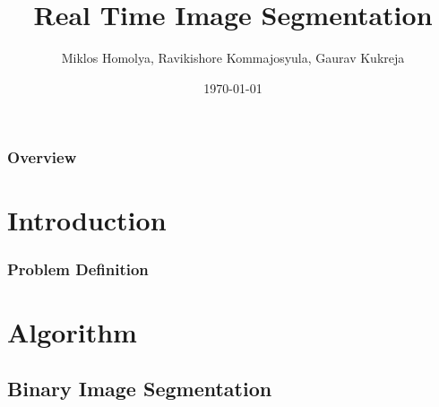 \documentclass{beamer}
\title[Short title]{Real Time Image Segmentation} %
\author{Miklos Homolya, Ravikishore Kommajosyula, Gaurav Kukreja} %
\institute[TUM] %
{
Technical University of Munich \\ %
\medskip
}
\date{\today} %
\begin{document}
\begin{frame}
\titlepage %
\end{frame}

\begin{frame}
\frametitle{Overview} %
\tableofcontents %
\end{frame}


\section{Introduction} %

\begin{frame}
\frametitle{Problem Definition}

\end{frame}


\section{Algorithm}

\subsection{Binary Image Segmentation}
\end{document}
